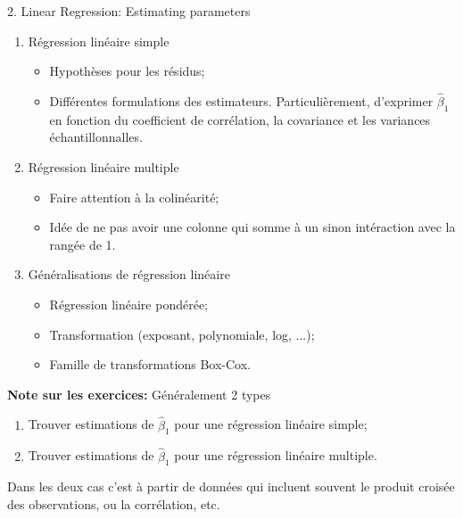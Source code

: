 \documentclass[12pt, titlepage, french]{report}
\begin{document}
\begin{CHPT_SUMM}[label = {LM-ESTIMATION}]{2. Linear Regression:  Estimating parameters}
\begin{enumerate}
	\item	Régression linéaire simple
	\begin{itemize}
		\item	Hypothèses pour les résidus;
		\item	Différentes formulations des estimateurs. Particulièrement, d'exprimer $\hat\beta_{1}$ en fonction du coefficient de corrélation, la covariance et les variances échantillonnalles.
	\end{itemize}
	\item	Régression linéaire multiple
	\begin{itemize}
		\item	Faire attention à la colinéarité;
		\item	Idée de ne pas avoir une colonne qui somme à un sinon intéraction avec la rangée de 1.
	\end{itemize}
	\item	Généralisations de régression linéaire
	\begin{itemize}
		\item	Régression linéaire pondérée;
		\item	Transformation (exposant, polynomiale, log, ...);
		\item	Famille de transformations Box-Cox.
	\end{itemize}
\end{enumerate}
\textbf{Note sur les exercices:} Généralement 2 types
\begin{enumerate}
	\item	Trouver estimations de $\hat\beta_{1}$ pour une régression linéaire simple;
	\item	Trouver estimations de $\hat\beta_{1}$ pour une régression linéaire multiple.
\end{enumerate}
Dans les deux cas c'est à partir de données qui incluent souvent le produit croisée des observations, ou la corrélation, etc.
\end{CHPT_SUMM}
\end{document}
